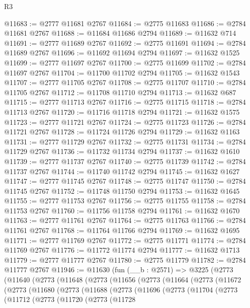 \begin{lexlean}{R3}
\begin{coremodule}
@11683 := @2777 @11681 @2767
@11684 := @2775 @11683
@11686 := @2784 @11681 @2767
@11688 := @11684 @11686 @2794
@11689 := @11632 @714
@11691 := @2777 @11689 @2767
@11692 := @2775 @11691
@11694 := @2784 @11689 @2767
@11696 := @11692 @11694 @2794
@11697 := @11632 @1525
@11699 := @2777 @11697 @2767
@11700 := @2775 @11699
@11702 := @2784 @11697 @2767
@11704 := @11700 @11702 @2794
@11705 := @11632 @1543
@11707 := @2777 @11705 @2767
@11708 := @2775 @11707
@11710 := @2784 @11705 @2767
@11712 := @11708 @11710 @2794
@11713 := @11632 @687
@11715 := @2777 @11713 @2767
@11716 := @2775 @11715
@11718 := @2784 @11713 @2767
@11720 := @11716 @11718 @2794
@11721 := @11632 @1575
@11723 := @2777 @11721 @2767
@11724 := @2775 @11723
@11726 := @2784 @11721 @2767
@11728 := @11724 @11726 @2794
@11729 := @11632 @1163
@11731 := @2777 @11729 @2767
@11732 := @2775 @11731
@11734 := @2784 @11729 @2767
@11736 := @11732 @11734 @2794
@11737 := @11632 @1610
@11739 := @2777 @11737 @2767
@11740 := @2775 @11739
@11742 := @2784 @11737 @2767
@11744 := @11740 @11742 @2794
@11745 := @11632 @1627
@11747 := @2777 @11745 @2767
@11748 := @2775 @11747
@11750 := @2784 @11745 @2767
@11752 := @11748 @11750 @2794
@11753 := @11632 @1645
@11755 := @2777 @11753 @2767
@11756 := @2775 @11755
@11758 := @2784 @11753 @2767
@11760 := @11756 @11758 @2794
@11761 := @11632 @1670
@11763 := @2777 @11761 @2767
@11764 := @2775 @11763
@11766 := @2784 @11761 @2767
@11768 := @11764 @11766 @2794
@11769 := @11632 @1695
@11771 := @2777 @11769 @2767
@11772 := @2775 @11771
@11774 := @2784 @11769 @2767
@11776 := @11772 @11774 @2794
@11777 := @11632 @1713
@11779 := @2777 @11777 @2767
@11780 := @2775 @11779
@11782 := @2784 @11777 @2767
@11946 := @11630
    (fun (__b : @2571) =>
    @3225
      (@2773
        (@11640
          (@2773
            (@11648
              (@2773
                (@11656
                  (@2773
                    (@11664
                      (@2773
                        (@11672
                          (@2773
                            (@11680
                              (@2773
                                (@11688
                                  (@2773
                                    (@11696
                                      (@2773
                                        (@11704
                                          (@2773
                                            (@11712
                                              (@2773
                                                (@11720
                                                  (@2773
                                                    (@11728

\end{coremodule}
\end{lexlean}
